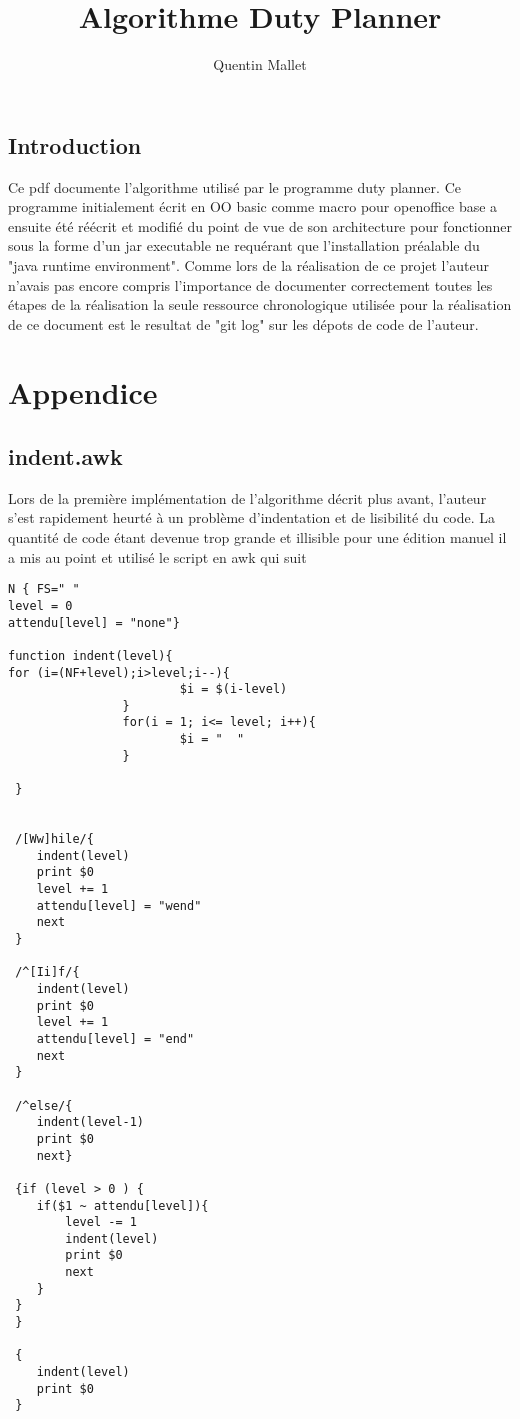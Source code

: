 \documentclass[11pt]{report}
\begin{document}
\title{Algorithme Duty Planner}

\author{Quentin Mallet}


\maketitle

\tableofcontents

\section{Introduction}
Ce pdf documente l'algorithme utilisé par le programme duty planner.
Ce programme initialement écrit en OO basic comme macro pour openoffice base a ensuite été réécrit et modifié du point de vue de son architecture pour fonctionner sous la forme d'un jar executable ne requérant que l'installation préalable du "java runtime environment". 
Comme lors de la réalisation de ce projet l'auteur n'avais pas encore compris l'importance de documenter correctement toutes les étapes de la réalisation la seule ressource chronologique utilisée pour la réalisation de ce document est le resultat de "git log" sur les dépots de code de l'auteur.

\chapter{Appendice}
\section{indent.awk}
Lors de la première implémentation de l'algorithme décrit plus avant, l'auteur s'est rapidement heurté à un problème d'indentation et de lisibilité du code. La quantité de code étant devenue trop grande et illisible pour une édition manuel il a mis au point et utilisé le script en awk qui suit
\begin{verbatim}
N { FS=" " 
level = 0
attendu[level] = "none"}

function indent(level){
for (i=(NF+level);i>level;i--){
                        $i = $(i-level)
                }
                for(i = 1; i<= level; i++){
                        $i = "  "
                }

 }


 /[Ww]hile/{
	indent(level)
	print $0
	level += 1
	attendu[level] = "wend"
	next
 }

 /^[Ii]f/{
	indent(level)
	print $0
	level += 1
	attendu[level] = "end"
	next
 }

 /^else/{
	indent(level-1)
	print $0
	next}

 {if (level > 0 ) {
	if($1 ~ attendu[level]){
		level -= 1
		indent(level)
		print $0
		next
	}
 }
 }

 {
	indent(level)
	print $0
 }
\end{verbatim}
\end{document}
